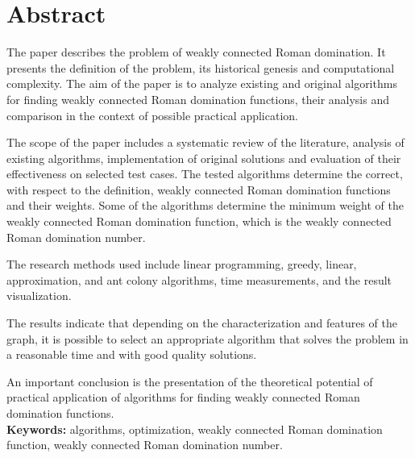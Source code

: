 \chapter*{Abstract}
The paper describes the problem of weakly connected Roman domination. It presents the definition of the problem, its historical genesis and computational complexity. The aim of the paper is to analyze existing and original algorithms for finding weakly connected Roman domination functions, their analysis and comparison in the context of possible practical application.

The scope of the paper includes a systematic review of the literature, analysis of existing algorithms, implementation of original solutions and evaluation of their effectiveness on selected test cases. The tested algorithms determine the correct, with respect to the definition, weakly connected Roman domination functions and their weights. Some of the algorithms determine the minimum weight of the weakly connected Roman domination function, which is the weakly connected Roman domination number.

The research methods used include linear programming, greedy, linear, approximation, and ant colony algorithms, time measurements, and the result visualization.

The results indicate that depending on the characterization and features of the graph, it is possible to select an appropriate algorithm that solves the problem in a reasonable time and with good quality solutions.

An important conclusion is the presentation of the theoretical potential of practical application of algorithms for finding weakly connected Roman domination functions.\\

\textbf{Keywords:} algorithms, optimization, weakly connected Roman domination function, weakly connected Roman domination number.
